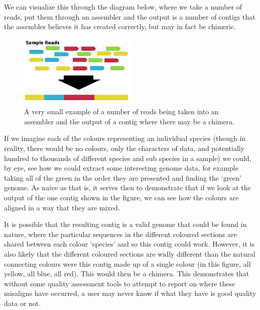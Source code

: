We can visualize this through  the diagram below, where we take a number of reads, put them through an assembler and the output is a number of contigs that the assembler believes it has created correctly, but may in fact be chimeric.

\begin{figure}[H]
	\centering
\includegraphics[width=0.5\textwidth]{images/basicmetaassembly}
	\caption{A very small example of a number of reads being taken into an assembler and the output of a contig where there may be a chimera.}
\end{figure}

If we imagine each of the colours representing an individual species (though in reality, there would be no colours, only the characters of data, and potentially hundred to thousands of different species and sub species in a sample) we could, by eye, see how we could extract some interesting genome data, for example taking all of the green in the order they are presented and finding the `green' genome. As naive as that is, it serves then to demonstrate that if we look at the output of the one contig shown in the figure, we can see how the  colours are aligned in a way that they are mixed.

It is possible that the resulting contig is a valid genome that could be found in nature, where the particular sequences in the different coloured sections are shared between each colour `species' and so this contig could work. However, it is also likely that the different coloured sections are widly different than the natural connecting colours were this contig made up of a single colour (in this figure, all yellow, all blue, all red). This would then be a chimera. This demonstrates that without some quality assessment tools to attempt to report on where these misaligns have occurred, a user may never know if what they have is good quality data or not.

